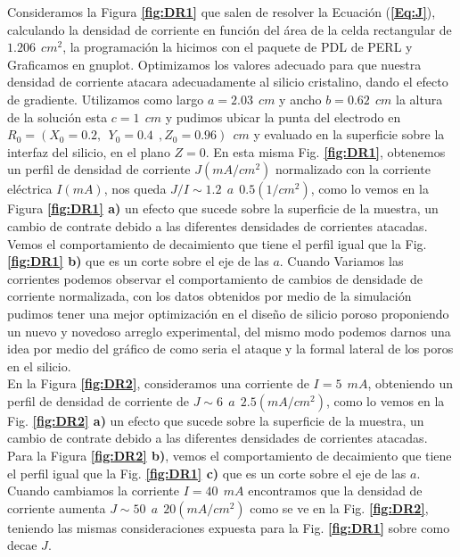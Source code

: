 \documentclass[a4paper,11pt,]{book}
\begin{document}
Consideramos la Figura \textbf{\ref{fig:DR1}}  que salen de resolver la Ecuación (\textbf{\ref{Eq:J}}), calculando la densidad de corriente en función del área de la  celda rectangular  de $1.206\ \ cm^2 $, la programación la hicimos con el paquete de PDL de PERL y Graficamos en gnuplot. Optimizamos los valores adecuado para que nuestra densidad de corriente atacara adecuadamente al silicio cristalino, dando el efecto de gradiente. Utilizamos como largo $a=2.03\ \ cm$ y ancho $b=0.62\ \ cm$ la altura de la solución esta $c=1\ \ cm$ y pudimos ubicar la punta del electrodo en $R_0 =(X_0=0.2,\ \ Y_0=0.4 \ \ , Z_0=0.96) \ \ cm$ y evaluado en la superficie sobre la interfaz del silicio, en el plano $Z=0$. En esta misma Fig. \textbf{\ref{fig:DR1}}, obtenemos  un perfil de densidad de corriente $J(mA/cm^2) $ normalizado con la corriente eléctrica $I(mA)$, nos queda $J/I \sim 1.2 \ \ a \ \ 0.5 (1/cm^2) $, como lo vemos en la  Figura \textbf{\ref{fig:DR1} a)} un  efecto que sucede sobre la superficie de la muestra, un cambio de contrate debido a las diferentes densidades de corrientes atacadas. Vemos el comportamiento de decaimiento que tiene el perfil igual que  la Fig. \textbf{\ref{fig:DR1} b)} que es un corte sobre el eje de las $a$. Cuando Variamos las corrientes podemos observar el comportamiento de cambios de densidade de corriente normalizada, con los datos obtenidos por medio de la simulación pudimos tener una  mejor optimización en el diseño de silicio poroso proponiendo un nuevo y novedoso arreglo experimental, del mismo modo podemos darnos una idea por medio del gráfico de como  seria el ataque y la formal lateral de los poros en el silicio.\\ 
 En la Figura \textbf{\ref{fig:DR2}}, consideramos una corriente de $I=5\ \ mA$, obteniendo un perfil de densidad de corriente de $J\sim 6 \ \ a \ \ 2.5 (mA/cm^2) $, como lo vemos en la Fig. \textbf{\ref{fig:DR2} a)} un  efecto que sucede sobre la superficie de la muestra, un cambio de contrate debido a las diferentes densidades de corrientes atacadas. Para la Figura \textbf{ \ref{fig:DR2} b)}, vemos el comportamiento de decaimiento que tiene el perfil igual que la Fig. \textbf{\ref{fig:DR1} c)} que es un corte sobre el eje de las $a$. Cuando cambiamos la corriente $I= 40 \ \ mA$ encontramos que la densidad de corriente aumenta $J\sim 50 \ \ a \ \ 20 (mA/cm^2) $ como se ve en  la  Fig. \textbf{\ref{fig:DR2}}, teniendo las mismas consideraciones expuesta para la  Fig. \textbf{\ref{fig:DR1}} sobre como decae $J$.
\end{document}
